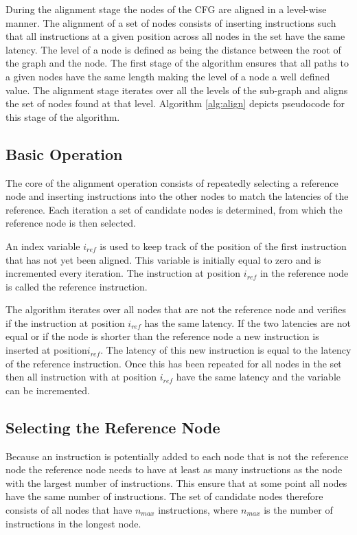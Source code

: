 During the alignment stage the nodes of the CFG are aligned in a level-wise manner. 
The alignment of a set of nodes consists of inserting instructions such that all instructions at a given position across all nodes in the set have the same latency. 
The level of a node is defined as being the distance between the root of the graph and the node. The first stage of the algorithm ensures that all paths to a given nodes have the same length making the level of a node a well 
defined value. The alignment stage iterates over all the levels of the sub-graph and aligns the set of nodes found at that level. Algorithm \ref{alg:align} depicts pseudocode for this stage of the algorithm.

\subsection{Basic Operation}
The core of the alignment operation consists of repeatedly selecting a reference node and inserting instructions into the other nodes to match the latencies of the reference. 
Each iteration a set of candidate nodes is determined, from which the reference node is then selected. 

An index variable $i_{ref}$ is used to keep track of the position of the first instruction that has not yet been aligned. This variable is initially equal to zero and is incremented every iteration. 
The instruction at position $i_{ref}$ in the reference node is called the reference instruction.

The algorithm iterates over all nodes that are not the reference node and verifies if the instruction at position $i_{ref}$ has the same latency. 
If the two latencies are not equal or if the node is shorter than the reference node a new instruction is inserted at position$i_{ref}$. 
The latency of this new instruction is equal to the latency of the reference instruction. 
Once this has been repeated for all nodes in the set then all instruction with at position $i_{ref}$ have the same latency and the variable can be incremented. 

\subsection{Selecting the Reference Node}
Because an instruction is potentially added to each node that is not the reference node the reference node needs to have at least as many instructions as the node with the largest number of instructions. 
This ensure that at some point all nodes have the same number of instructions. 
The set of candidate nodes therefore consists of all nodes that have $n_{max}$ instructions, where $n_{max}$ is the number of instructions in the longest node. 

